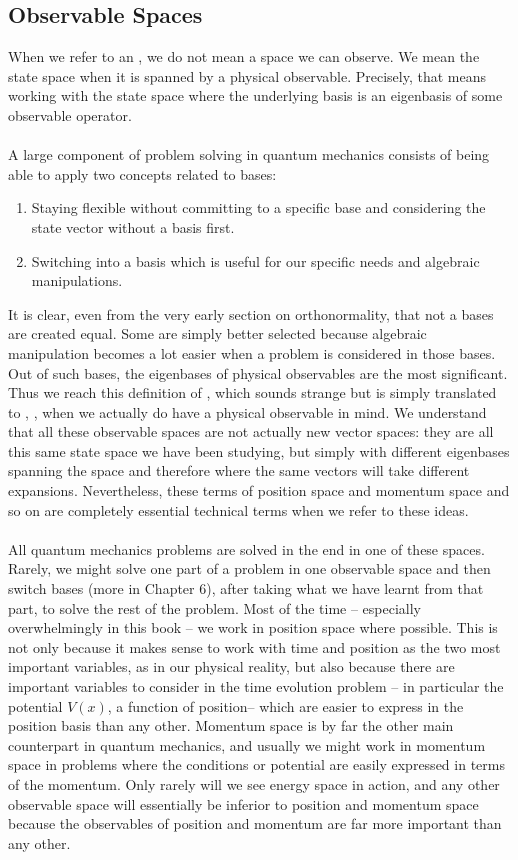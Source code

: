 \subsection{Observable Spaces}
When we refer to an , we do not mean a space we can observe. We mean the state space when it is spanned by a physical observable. Precisely, that means working with the state space where the underlying basis is an eigenbasis of some observable operator.
\\\\
A large component of problem solving in quantum mechanics consists of being able to apply two concepts related to bases:
\begin{enumerate}
    \item Staying flexible without committing to a specific base and considering the state vector without a basis first.
    \item Switching into a basis which is useful for our specific needs and algebraic manipulations. 
\end{enumerate}
It is clear, even from the very early section on orthonormality, that not a bases are created equal. Some are simply better selected because algebraic manipulation becomes a lot easier when a problem is considered in those bases. Out of such bases, the eigenbases of physical observables are the most significant. Thus we reach this definition of , which sounds strange but is simply translated to , ,  when we actually do have a physical observable in mind. We understand that all these observable spaces are not actually new vector spaces: they are all this same state space we have been studying, but simply with different eigenbases spanning the space and therefore where the same vectors will take different expansions. Nevertheless, these terms of position space and momentum space and so on are completely essential technical terms when we refer to these ideas.
\\\\
All quantum mechanics problems are solved in the end in one of these spaces. Rarely, we might solve one part of a problem in one observable space and then switch bases (more in Chapter 6), after taking what we have learnt from that part, to solve the rest of the problem. Most of the time -- especially overwhelmingly in this book -- we work in position space  where possible. This is not only because it makes sense to work with time and position as the two most important variables, as in our physical reality, but also because there are important variables to consider in the time evolution problem -- in particular the potential $V(x)$, a function of position-- which are easier to express in the position basis than any other. Momentum space is by far the other main counterpart in quantum mechanics, and usually we might work in momentum space in problems where the conditions or potential are easily expressed in terms of the momentum. Only rarely will we see energy space in action, and any other observable space will essentially be inferior to position and momentum space because the observables of position and momentum are far more important than any other.
